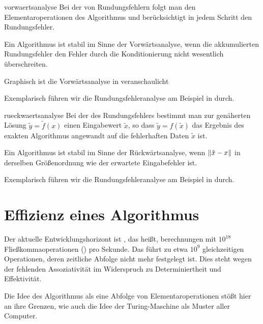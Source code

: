 \begin{Definition}{vorwaertsanalyse}
  Bei der  von Rundungsfehlern folgt man den
  Elementaroperationen des Algorithmus und berücksichtigt in jedem
  Schritt den Rundungsfehler.

  Ein Algorithmus ist stabil im Sinne der Vorwärtsanalyse, wenn die
  akkumulierten Rundungsfehler den Fehler durch die Konditionierung
  nicht wesentlich überschreiten.
\end{Definition}

\begin{remark}
  Graphisch ist die Vorwärtsanalyse in \cite[Abschnitt
  2.3.1]{DeuflhardHohmann08} veranschaulicht
\end{remark}

\begin{example}
  Exemplarisch führen wir die Rundungsfehleranalyse am Beispiel in
  \cite[Abschnitt 1.3.2]{Rannacher17} durch.
\end{example}

\begin{Definition}{rueckwaertsanalyse}
  Bei der  des Rundungsfehlers bestimmt man
  zur genäherten Lösung $\tilde y = \tilde f(x)$ einen Eingabewert
  $\tilde x$, so dass $\tilde y = f(\tilde x)$ das Ergebnis des
  exakten Algorithmus angewandt auf die fehlerhaften Daten $\tilde x$
  ist.

  Ein Algorithmus ist stabil im Sinne der Rückwärtsanalyse, wenn
  $\lVert\tilde x-x\rVert$ in derselben Größenordnung wie der erwartete
  Eingabefehler ist.
\end{Definition}

\begin{example}
  Exemplarisch führen wir die Rundungsfehleranalyse am Beispiel in
  \cite[Lemma 2.30]{DeuflhardHohmann08} durch.
\end{example}

\section{Effizienz eines Algorithmus}

\begin{remark}
  Der aktuelle Entwicklungshorizont ist ,
  das heißt, berechnungen mit $10^{18}$ Fließkommaoperationen
  () pro Sekunde. Das führt zu etwa $10^9$ gleichzeitigen
  Operationen, deren zeitliche Abfolge nicht mehr festgelegt ist. Dies
  steht wegen der fehlenden Assoziativität im Widerspruch zu
  Determiniertheit und Effektivität.

  Die Idee des Algorithmus als eine \glqq Abfolge von
  Elementaroperationen\grqq{} stößt hier an ihre Grenzen, wie auch die
  Idee der Turing-Maschine als Muster aller Computer.
\end{remark}

